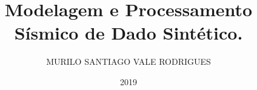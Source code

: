 \documentclass[G]{cpgf}
\begin{document}
\title{Modelagem e Processamento Sísmico de Dado Sintético.}
\author{MURILO SANTIAGO VALE RODRIGUES} %
\date{2019}







\capa %
\rosto  %

% 



 


\tableofcontents        







% 
% 


 


\apendices


%
\end{document}
